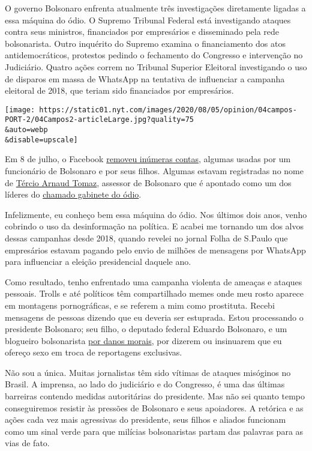 O governo Bolsonaro enfrenta atualmente três investigações diretamente
ligadas a essa máquina do ódio. O Supremo Tribunal Federal está
investigando ataques contra seus ministros, financiados por empresários
e disseminado pela rede bolsonarista. Outro inquérito do Supremo examina
o financiamento dos atos antidemocráticos, protestos pedindo o
fechamento do Congresso e intervenção no Judiciário. Quatro ações correm
no Tribunal Superior Eleitoral investigando o uso de disparos em massa
de WhatsApp na tentativa de influenciar a campanha eleitoral de 2018,
que teriam sido financiados por empresários.

\texttt{[image: https://static01.nyt.com/images/2020/08/05/opinion/04campos-PORT-2/04Campos2-articleLarge.jpg?quality=75\\\&auto=webp\\\&disable=upscale]}

Em 8 de julho, o Facebook
\href{https://www1.folha.uol.com.br/poder/2020/07/facebook-remove-contas-falsas-ligadas-aos-bolsonaros-e-ao-gabinete-da-presidencia.shtml}{removeu
inúmeras contas}, algumas usadas por um funcionário de Bolsonaro e por
seus filhos. Algumas estavam registradas no nome de
\href{https://elpais.com/internacional/2020-07-10/facebook-rompe-la-oficina-del-odio-una-red-de-88-cuentas-de-apoyo-a-jair-bolsonaro.html}{Tércio
Arnaud Tomaz}, assessor de Bolsonaro que é apontado como um dos líderes
do \href{https://apnews.com/0c58cccec2004bf250c8dab38172cbc9}{chamado
gabinete do ódio}.

Infelizmente, eu conheço bem essa máquina do ódio. Nos últimos dois
anos, venho cobrindo o uso da desinformação na política. E acabei me
tornando um dos alvos dessas campanhas desde 2018, quando revelei no
jornal Folha de S.Paulo que empresários estavam pagando pelo envio de
milhões de mensagens por WhatsApp para influenciar a eleição
presidencial daquele ano.

Como resultado, tenho enfrentado uma campanha violenta de ameaças e
ataques pessoais. Trolls e até políticos têm compartilhado memes onde
meu rosto aparece em montagens pornográficas, e se referem a mim como
prostituta. Recebi mensagens de pessoas dizendo que eu deveria ser
estuprada. Estou processando o presidente Bolsonaro; seu filho, o
deputado federal Eduardo Bolsonaro, e um blogueiro bolsonarista
\href{http://www.fundamedios.us/incidentes/patriciacampos-demanda-jairbolsonaro-ofensas-periodista/}{por
danos morais}, por dizerem ou insinuarem que eu ofereço sexo em troca de
reportagens exclusivas.

Não sou a única. Muitas jornalistas têm sido vítimas de ataques
misóginos no Brasil. A imprensa, ao lado do judiciário e do Congresso, é
uma das últimas barreiras contendo medidas autoritárias do presidente.
Mas não sei quanto tempo conseguiremos resistir às pressões de Bolsonaro
e seus apoiadores. A retórica e as ações cada vez mais agressivas do
presidente, seus filhos e aliados funcionam como um sinal verde para que
milícias bolsonaristas partam das palavras para as vias de fato.

